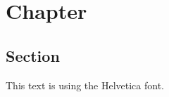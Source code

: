 \documentclass{report}
\begin{document}
\chapter{Chapter}
\section{Section}
This text is using the Helvetica font.
\end{document}
